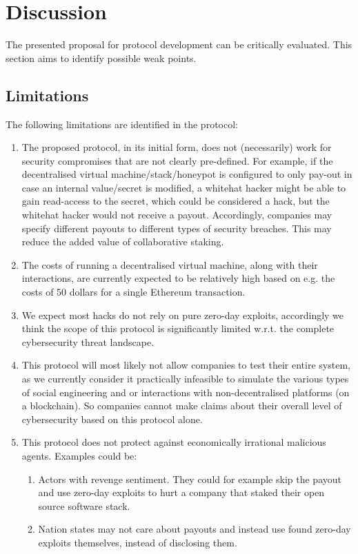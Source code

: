 \section{Discussion}
\label{sec:discussion}
The presented proposal for protocol development can be critically evaluated. This section aims to identify possible weak points.
\subsection{Limitations}
The following limitations are identified in the protocol:
\begin{enumerate}
    \item The proposed protocol, in its initial form, does not (necessarily) work for security compromises that are not clearly pre-defined. For example, if the decentralised virtual machine/stack/honeypot is configured to only pay-out in case an internal value/secret is modified, a whitehat hacker might be able to gain read-access to the secret, which could be considered a hack, but the whitehat hacker would not receive a payout. Accordingly, companies may specify different payouts to different types of security breaches. This may reduce the added value of collaborative staking.
    \item The costs of running a decentralised virtual machine, along with their interactions, are currently expected to be relatively high based on e.g. the costs of 50 dollars for a single Ethereum transaction.
    \item We expect most hacks do not rely on pure zero-day exploits, accordingly we think the scope of this protocol is significantly limited w.r.t. the complete cybersecurity threat landscape.
    \item This protocol will most likely not allow companies to test their entire system, as we currently consider it practically infeasible to simulate the various types of social engineering and or interactions with non-decentralised platforms (on a blockchain). So companies cannot make claims about their overall level of cybersecurity based on this protocol alone.
    \item This protocol does not protect against economically irrational malicious agents. Examples could be:
    \begin{enumerate}
        \item Actors with revenge sentiment. They could for example skip the payout and use zero-day exploits to hurt a company that staked their open source software stack.
        \item Nation states may not care about payouts and instead use found zero-day exploits themselves, instead of disclosing them.
    \end{enumerate}
\end{enumerate}

